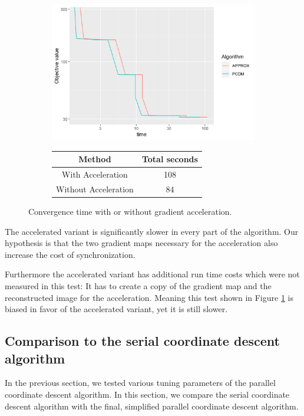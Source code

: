 \begin{figure}[h]
	\centering
	\begin{subfigure}{0.6\linewidth}
		\includegraphics[width=1.0\linewidth]{./chapters/05.pcdm/parameters/acceleration.png}
	\end{subfigure}
	\begin{subfigure}{0.35\linewidth}
		\begin{tabular}{c | c}
			Method & Total seconds \\ \hline
			With Acceleration & 108 \\
			Without Acceleration & 84 \\
		\end{tabular}
	\end{subfigure}
	\caption{Convergence time with or without gradient acceleration.}
	\label{pcdm:results:acc}
\end{figure}

The accelerated variant is significantly slower in every part of the algorithm. Our hypothesis is that the two gradient maps necessary for the acceleration also increase the cost of synchronization.

Furthermore the accelerated variant has additional run time costs which were not measured in this test: It has to create a copy of the gradient map and the reconstructed image for the acceleration. Meaning this test shown in Figure \ref{pcdm:results:acc} is biased in favor of the accelerated variant, yet it is still slower.


\subsection{Comparison to the serial coordinate descent algorithm}
In the previous section, we tested various tuning parameters of the parallel coordinate descent algorithm. In this section, we compare the serial coordinate descent algorithm with the final, simplified parallel coordinate descent algorithm.

